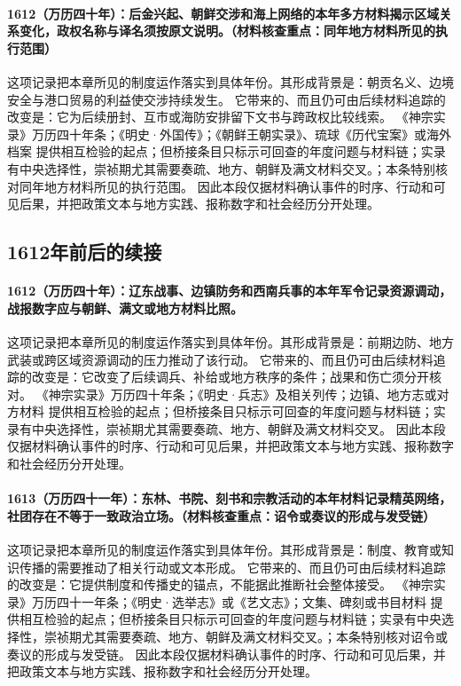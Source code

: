 \paragraph{1612（万历四十年）：后金兴起、朝鲜交涉和海上网络的本年多方材料揭示区域关系变化，政权名称与译名须按原文说明。（材料核查重点：同年地方材料所见的执行范围）} 这项记录把本章所见的制度运作落实到具体年份。其形成背景是：朝贡名义、边境安全与港口贸易的利益使交涉持续发生。 它带来的、而且仍可由后续材料追踪的改变是：它为后续册封、互市或海防安排留下文书与跨政权比较线索。 《神宗实录》万历四十年条；《明史·外国传》；《朝鲜王朝实录》、琉球《历代宝案》或海外档案 提供相互检验的起点；但桥接条目只标示可回查的年度问题与材料链；实录有中央选择性，崇祯期尤其需要奏疏、地方、朝鲜及满文材料交叉。；本条特别核对同年地方材料所见的执行范围。 因此本段仅据材料确认事件的时序、行动和可见后果，并把政策文本与地方实践、报称数字和社会经历分开处理。

\subsection{1612年前后的续接}

\paragraph{1612（万历四十年）：辽东战事、边镇防务和西南兵事的本年军令记录资源调动，战报数字应与朝鲜、满文或地方材料比照。} 这项记录把本章所见的制度运作落实到具体年份。其形成背景是：前期边防、地方武装或跨区域资源调动的压力推动了该行动。 它带来的、而且仍可由后续材料追踪的改变是：它改变了后续调兵、补给或地方秩序的条件；战果和伤亡须分开核对。 《神宗实录》万历四十年条；《明史·兵志》及相关列传；边镇、地方志或对方材料 提供相互检验的起点；但桥接条目只标示可回查的年度问题与材料链；实录有中央选择性，崇祯期尤其需要奏疏、地方、朝鲜及满文材料交叉。 因此本段仅据材料确认事件的时序、行动和可见后果，并把政策文本与地方实践、报称数字和社会经历分开处理。

\paragraph{1613（万历四十一年）：东林、书院、刻书和宗教活动的本年材料记录精英网络，社团存在不等于一致政治立场。（材料核查重点：诏令或奏议的形成与发受链）} 这项记录把本章所见的制度运作落实到具体年份。其形成背景是：制度、教育或知识传播的需要推动了相关行动或文本形成。 它带来的、而且仍可由后续材料追踪的改变是：它提供制度和传播史的锚点，不能据此推断社会整体接受。 《神宗实录》万历四十一年条；《明史·选举志》或《艺文志》；文集、碑刻或书目材料 提供相互检验的起点；但桥接条目只标示可回查的年度问题与材料链；实录有中央选择性，崇祯期尤其需要奏疏、地方、朝鲜及满文材料交叉。；本条特别核对诏令或奏议的形成与发受链。 因此本段仅据材料确认事件的时序、行动和可见后果，并把政策文本与地方实践、报称数字和社会经历分开处理。

